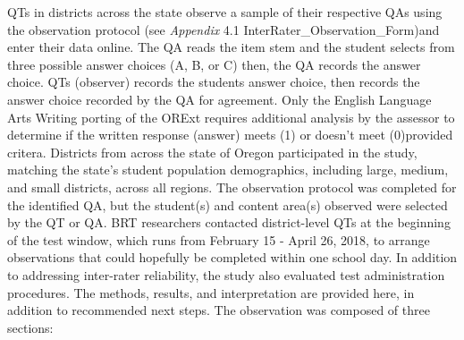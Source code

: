 \documentclass[]{article}
\begin{document}
QTs in districts across the state observe a sample of their respective
QAs using the observation protocol (see \emph{Appendix} 4.1
InterRater\_Observation\_Form)and enter their data online. The QA reads
the item stem and the student selects from three possible answer choices
(A, B, or C) then, the QA records the answer choice. QTs (observer)
records the students answer choice, then records the answer choice
recorded by the QA for agreement. Only the English Language Arts Writing
porting of the ORExt requires additional analysis by the assessor to
determine if the written response (answer) meets (1) or doesn't meet
(0)provided critera. Districts from across the state of Oregon
participated in the study, matching the state's student population
demographics, including large, medium, and small districts, across all
regions. The observation protocol was completed for the identified QA,
but the student(s) and content area(s) observed were selected by the QT
or QA. BRT researchers contacted district-level QTs at the beginning of
the test window, which runs from February 15 - April 26, 2018, to
arrange observations that could hopefully be completed within one school
day. In addition to addressing inter-rater reliability, the study also
evaluated test administration procedures. The methods, results, and
interpretation are provided here, in addition to recommended next steps.
The observation was composed of three sections:
\end{document}
